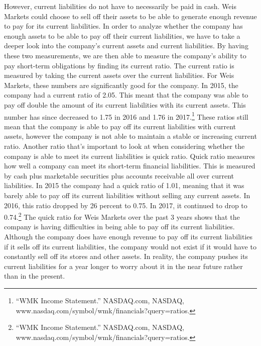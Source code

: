 \documentclass[12pt]{article}
\begin{document}
\begin{doublespacing}
However, current liabilities do not have to necessarily be paid in cash. Weis Markets could choose to sell off their assets to be able to generate enough revenue to pay for its current liabilities. In order to analyze whether the company has enough assets to be able to pay off their current liabilities, we have to take a deeper look into the company’s current assets and current liabilities. By having these two measurements, we are then able to measure the company’s ability to pay short-term obligations by finding its current ratio. The current ratio is measured by taking the current assets over the current liabilities. For Weis Markets, these numbers are significantly good for the company. In 2015, the company had a current ratio of 2.05. This meant that the company was able to pay off double the amount of its current liabilities with its current assets. This number has since decreased to 1.75 in 2016 and 1.76 in 2017.\footnote{“WMK Income Statement.” NASDAQ.com, NASDAQ, www.nasdaq.com/symbol/wmk/financials?query=ratios.} These ratios still mean that the company is able to pay off its current liabilities with current assets, however the company is not able to maintain a stable or increasing current ratio.
Another ratio that’s important to look at when considering whether the company is able to meet its current liabilities is quick ratio. Quick ratio measures how well a company can meet its short-term financial liabilities. This is measured by cash plus marketable securities plus accounts receivable all over current liabilities. In 2015 the company had a quick ratio of 1.01, meaning that it was barely able to pay off its current liabilities without selling any current assets. In 2016, this ratio dropped by 26 percent to 0.75. In 2017, it continued to drop to 0.74.\footnote{“WMK Income Statement.” NASDAQ.com, NASDAQ, www.nasdaq.com/symbol/wmk/financials?query=ratios.} The quick ratio for Weis Markets over the past 3 years shows that the company is having difficulties in being able to pay off its current liabilities. Although the company does have enough revenue to pay off its current liabilities if it sells off its current liabilities, the company would not exist if it would have to constantly sell off its stores and other assets. In reality, the company pushes its current liabilities for a year longer to worry about it in the near future rather than in the present.

\end{doublespacing}
\end{document}
